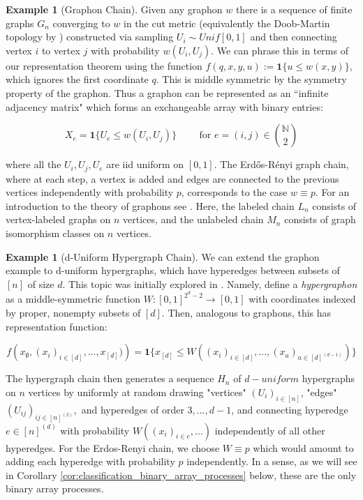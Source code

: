 \documentclass[11pt,oneside,reqno]{article}
\theoremstyle{plain}
\theoremstyle{definition}
\newtheorem{example}[theorem]{Example}
\numberwithin{equation}{section}
\renewcommand{\cite}{\citet}
\renewcommand{\leq}{\leqslant}
\newcommand{\N}{\mathbb{N}}
\newcommand{\ind}{\mathbf{1}}
\begin{document}
\begin{example}[Graphon Chain]
    Given any graphon $w$ there is a sequence of finite graphs $G_n$ converging to $w$ in the cut metric (equivalently the Doob-Martin topology by \cite{Grubel_2015_graphons}) constructed via sampling $U_i \sim Unif[0,1]$ and then connecting vertex $i$ to vertex $j$ with probability $w(U_i, U_j)$. We can phrase this in terms of our representation theorem using the function $f(q, x,y, u) := \ind \{u \leq w(x,y)\}$, which ignores the first coordinate $q$. This is middle symmetric by the symmetry property of the graphon. Thus a graphon can be represented as an ``infinite adjacency matrix" which forms an exchangeable array with binary entries:

    \[X_e = \ind \{U_e \leq w(U_i, U_j)\} \qquad \text{ for } e = (i,j) \in {\N \choose 2}\]

    \noindent where all the $U_i, U_j, U_e$ are iid uniform on $[0,1]$. The Erd\H{o}s-R\'enyi graph chain, where at each step, a vertex is added and edges are connected to the previous vertices independently with probability $p$, corresponds to the case $w \equiv p$. For an introduction to the theory of graphons see \cite{Meliot2024}. Here, the labeled chain $L_n$ consists of vertex-labeled graphs on $n$ vertices, and the unlabeled chain $M_n$ consists of graph isomorphism classes on $n$ vertices.

    \label{example:graphon_chain}
\end{example}

\begin{example}[d-Uniform Hypergraph Chain]
    We can extend the graphon example to d-uniform hypergraphs, which have hyperedges between subsets of $[n]$ of size $d$. This topic was initially explored in \cite{hypergraphons}. Namely, define a \textit{hypergraphon} as a middle-symmetric function $W:[0,1]^{2^d-2} \to [0,1]$ with coordinates indexed by proper, nonempty subsets of $[d]$. Then, analogous to graphons, this has representation function:

    \[f\left(x_\emptyset, (x_i)_{i \in [d]}, ..., x_{[d]})\right) = \ind \Big \{x_{[d]} \leq W\left((x_i)_{i \in [d]}, ...,  (x_a)_{a \in [d]^{(d-1)}}\right) \Big \}\]
    
    The hypergraph chain then generates a sequence $H_n$ of $d-uniform$ hypergraphs on $n$ vertices by uniformly at random drawing "vertices" $(U_i)_{i \in [n]}$, "edges" $(U_{ij})_{ij \in [n]^{(2)}},$ and hyperedges of order $3,..., d-1$, and connecting hyperedge $e \in [n]^{(d)}$ with probability $W((x_i)_{i \in e}, ...)$ independently of all other hyperedges. 
    For the Erdos-Renyi chain, we choose $W \equiv p$ which would amount to adding each hyperedge with probability $p$ independently. In a sense, as we will see in Corollary \ref{cor:classification_binary_array_processes} below, these are the only binary array processes. 
\end{example}
\end{document}
